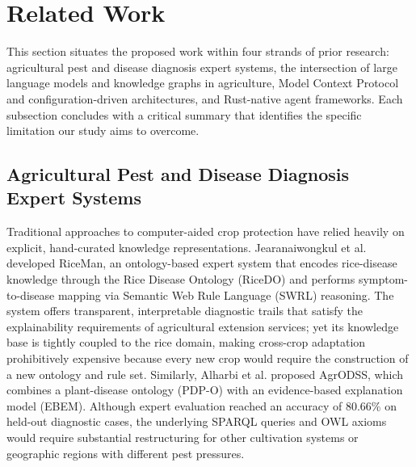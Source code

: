 \documentclass[11pt,a4paper]{article}
\begin{document}
\section{Related Work}
\label{sec:related-work}

This section situates the proposed work within four strands of prior research: agricultural pest and disease diagnosis expert systems, the intersection of large language models and knowledge graphs in agriculture, Model Context Protocol and configuration-driven architectures, and Rust-native agent frameworks. Each subsection concludes with a critical summary that identifies the specific limitation our study aims to overcome.

\subsection{Agricultural Pest and Disease Diagnosis Expert Systems}

Traditional approaches to computer-aided crop protection have relied heavily on explicit, hand-curated knowledge representations. Jearanaiwongkul et al. \cite{jearanaiwongkul2021riceman} developed RiceMan, an ontology-based expert system that encodes rice-disease knowledge through the Rice Disease Ontology (RiceDO) and performs symptom-to-disease mapping via Semantic Web Rule Language (SWRL) reasoning. The system offers transparent, interpretable diagnostic trails that satisfy the explainability requirements of agricultural extension services; yet its knowledge base is tightly coupled to the rice domain, making cross-crop adaptation prohibitively expensive because every new crop would require the construction of a new ontology and rule set. Similarly, Alharbi et al. \cite{alharbi2024agrodss} proposed AgrODSS, which combines a plant-disease ontology (PDP-O) with an evidence-based explanation model (EBEM). Although expert evaluation reached an accuracy of 80.66\% on held-out diagnostic cases, the underlying SPARQL queries and OWL axioms would require substantial restructuring for other cultivation systems or geographic regions with different pest pressures.
\end{document}
